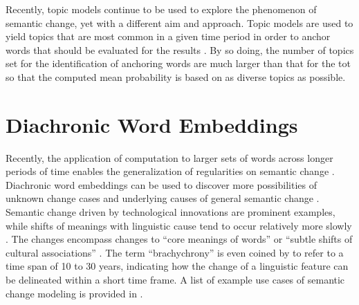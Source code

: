 Recently, topic models continue to be used to explore the phenomenon of semantic change, yet with a different aim and approach. Topic models are used to yield topics that are most common in a given time period in order to anchor words that should be evaluated for the results \parencite{antoniak2018evaluating}. By so doing, the number of topics set for the identification of anchoring words are much larger than that for the \gls{tot} so that the computed mean probability is based on as diverse topics as possible.

\section{Diachronic Word Embeddings}
Recently, the application of computation to larger sets of words across longer periods of time enables the generalization of regularities on semantic change \parencite{hamilton2016law}. Diachronic word embeddings can be used to discover more possibilities of unknown change cases and underlying causes of general semantic change \parencite{hamilton2016cultural,kutuzov2017tracing,heuser2017word}. Semantic change driven by technological innovations are prominent examples, while shifts of meanings with linguistic cause tend to occur relatively more slowly \parencite{hamilton2016law}. The changes encompass changes to ``core meanings of words'' or ``subtle shifts of cultural associations'' \parencite{hamilton2016cultural}. The term ``brachychrony'' is even coined by \textcite{mair1998corpora} to refer to a time span of 10 to 30 years, indicating how the change of a linguistic feature can be delineated within a short time frame. A list of example use cases of semantic change modeling is provided in .

